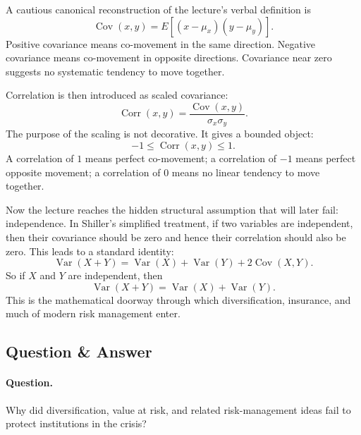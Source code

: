 A cautious canonical reconstruction of the lecture's verbal definition is
\begin{equation}
\operatorname{Cov}(x,y)=E[(x-\mu_x)(y-\mu_y)].
\end{equation}
Positive covariance means co-movement in the same direction. Negative covariance means co-movement in opposite directions. Covariance near zero suggests no systematic tendency to move together.

Correlation is then introduced as scaled covariance:
\begin{equation}
\operatorname{Corr}(x,y)=\frac{\operatorname{Cov}(x,y)}{\sigma_x\sigma_y}.
\end{equation}
The purpose of the scaling is not decorative. It gives a bounded object:
\begin{equation}
-1\le \operatorname{Corr}(x,y)\le 1.
\end{equation}
A correlation of \(1\) means perfect co-movement; a correlation of \(-1\) means perfect opposite movement; a correlation of \(0\) means no linear tendency to move together.

Now the lecture reaches the hidden structural assumption that will later fail: independence. In Shiller's simplified treatment, if two variables are independent, then their covariance should be zero and hence their correlation should also be zero. This leads to a standard identity:
\begin{equation}
\operatorname{Var}(X+Y)=\operatorname{Var}(X)+\operatorname{Var}(Y)+2\operatorname{Cov}(X,Y).
\end{equation}
So if \(X\) and \(Y\) are independent, then
\begin{equation}
\operatorname{Var}(X+Y)=\operatorname{Var}(X)+\operatorname{Var}(Y).
\end{equation}
This is the mathematical doorway through which diversification, insurance, and much of modern risk management enter.

\subsection{Question \& Answer}

\paragraph{Question.}
Why did diversification, value at risk, and related risk-management ideas fail to protect institutions in the crisis?


